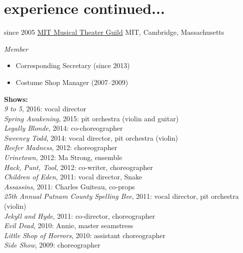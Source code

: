 \documentclass[]{friggeri-cv}
\begin{document}
\section{experience continued...}
\begin{entrylist}
  \entry
	{since 2005}
	{\href{http://web.mit.edu/mtg/www/}{MIT Musical Theater Guild}}
	{MIT, Cambridge, Massachusetts}
	{\emph{Member}
	\begin{itemize}
		\item Corresponding Secretary (since 2013)
		\item Costume Shop Manager (2007--2009)
	\end{itemize}
	\textbf{Shows:}\\
	\emph{9 to 5}, 2016: vocal director\\
	\emph{Spring Awakening}, 2015: pit orchestra (violin and guitar)\\
	\emph{Legally Blonde}, 2014: co-choreographer\\
	\emph{Sweeney Todd}, 2014: vocal director, pit orchestra (violin)\\
	\emph{Reefer Madness}, 2012: choreographer\\
	\emph{Urinetown}, 2012: Ma Strong, ensemble\\
	\emph{Hack, Punt, Tool}, 2012: co-writer, choreographer\\
	\emph{Children of Eden}, 2011: vocal director, Snake\\
	\emph{Assassins}, 2011: Charles Guiteau, co-props\\
	\emph{25th Annual Putnam County Spelling Bee}, 2011: vocal director, pit orchestra (violin)\\
	\emph{Jekyll and Hyde}, 2011: co-director, choreographer\\
	\emph{Evil Dead}, 2010: Annie, master seamstress\\
	\emph{Little Shop of Horrors}, 2010: assistant choreographer\\
	\emph{Side Show}, 2009: choreographer\\
}
\end{entrylist}
\end{document}
